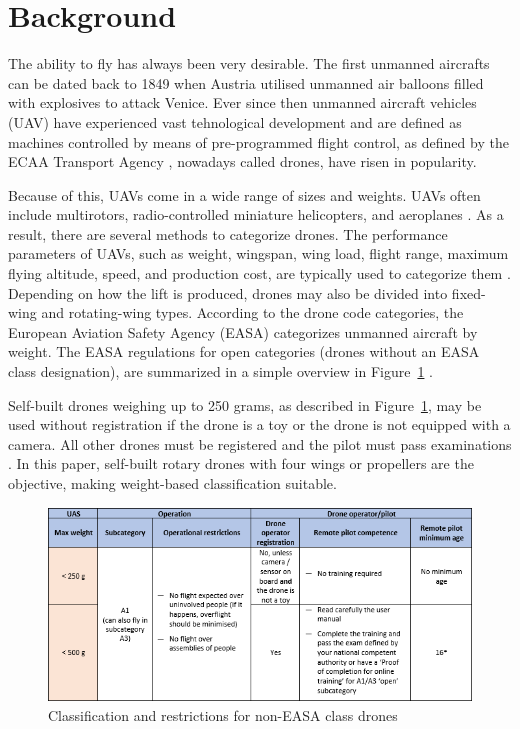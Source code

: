 \section{Background}

The ability to fly has always been very desirable. The first unmanned aircrafts can be dated back to 1849 when Austria utilised unmanned air balloons filled with explosives to attack Venice. \cite{Vyas2020}
Ever since then unmanned aircraft vehicles (UAV) have experienced vast tehnological development and are defined as machines controlled by means of pre-programmed flight control, as defined by the ECAA Transport Agency \cite{Droner}, nowadays called drones, have risen in popularity.

Because of this, UAVs come in a wide range of sizes and weights.
UAVs often include multirotors, radio-controlled miniature helicopters, and aeroplanes \cite{Ann2012}.
As a result, there are several methods to categorize drones. The performance parameters of UAVs, such as weight, wingspan, wing load, flight range, maximum flying altitude, speed, and production cost, are typically used to categorize them \cite{Hassanalian2017}.
Depending on how the lift is produced, drones may also be divided into fixed-wing and rotating-wing types.
According to the drone code categories, the European Aviation Safety Agency (EASA) categorizes unmanned aircraft by weight.
The EASA regulations for open categories (drones without an EASA class designation), are summarized in a simple overview in Figure~\ref{fig:Table} \cite{Euasa}.

Self-built drones weighing up to 250 grams, as described in Figure~\ref{fig:Table}, may be used without registration if the drone is a toy or the drone is not equipped with a camera. All other drones must be registered and the pilot must pass examinations \cite{Euasa}. In this paper, self-built rotary drones with four wings or propellers are the objective, making weight-based classification suitable.

\begin{figure}[H]
    \centering
    \includegraphics[scale = 0.9]{pictures/classification.PNG}
    \caption{Classification and restrictions for non-EASA class drones \cite{Euasa}}
    \label{fig:Table}
\end{figure}


